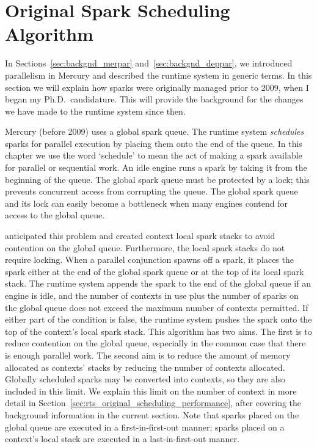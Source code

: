 
\section{Original Spark Scheduling Algorithm}
\label{sec:rts_original_scheduling}

In Sections~\ref{sec:backgnd_merpar} and~\ref{sec:backgnd_deppar},
we introduced parallelism in Mercury and described the runtime system in
generic terms.
In this section we will explain how sparks were originally managed
prior to 2009,
when I began my Ph.D.\ candidature.
This will provide the background for the changes we have made to the
runtime system since then.

Mercury (before 2009) uses a global spark queue.
The runtime system \emph{schedules} sparks for parallel execution by placing
them onto the end of the queue.
In this chapter we use the word `schedule' to mean the act of making a spark
available for parallel or sequential work.
An idle engine runs a spark by taking it from the beginning of the queue.
The global spark queue must be protected by a lock;
this prevents concurrent access from corrupting the queue.
The global spark queue and its lock can easily become a bottleneck when many
engines contend for access to the global queue.

\citet{wang:2006:hons} anticipated this problem and created context local spark
stacks to avoid contention on the global queue.
Furthermore, the local spark stacks do not require locking.
When a parallel conjunction spawns off a spark,
it places the spark either at the end of the global spark queue or at the
top of its local spark stack.
The runtime system appends the spark to the end of the global queue if
an engine is idle, and
the number of contexts in use plus the number of sparks on the global queue
does not exceed the maximum number of contexts permitted.
If either part of the condition is false,
the runtime system pushes the spark onto the top of the context's local
spark stack.
This algorithm has two aims.
The first is to reduce contention on the global queue,
especially in the common case that there is enough parallel work.
The second aim is to reduce the amount of memory allocated
as contexts' stacks by reducing the number of contexts allocated.
Globally scheduled sparks may be converted into contexts,
so they are also included in this limit.
We explain this limit on the number of context in more detail
in Section~\ref{sec:rts_original_scheduling_performance},
after covering the background information in the current section.
Note that sparks placed on the global queue are executed in a
first-in-first-out manner;
sparks placed on a context's local stack are executed in a
last-in-first-out manner.

